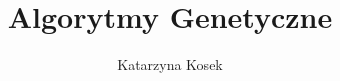 \documentclass{article}
\title{Algorytmy Genetyczne}
\author{Katarzyna Kosek}
\begin{document}
	\begin{itemize}
		
	\end{itemize}
\end{document}
